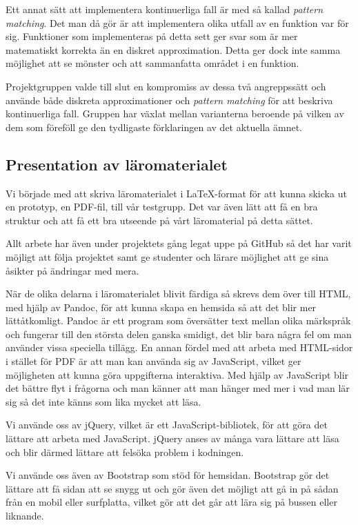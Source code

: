 \documentclass[12pt,a4paper,twoside,openright]{article}
\begin{document}
Ett annat sätt att implementera kontinuerliga fall är med så kallad
\textit{pattern matching}. Det man då gör är att implementera olika
utfall av en funktion var för sig. Funktioner som implementeras på
detta sett ger svar som är mer matematiskt korrekta än en diskret
approximation. Detta ger dock inte samma möjlighet att se mönster och
att sammanfatta området i en funktion.

Projektgruppen valde till slut en kompromiss av dessa två angreppssätt
och använde både diskreta approximationer och \textit{pattern
 matching} för att beskriva kontinuerliga fall. Gruppen har växlat
mellan varianterna beroende på vilken av dem som föreföll ge den
tydligaste förklaringen av det aktuella ämnet.

\subsection{Presentation av läromaterialet}
Vi började med att skriva läromaterialet i LaTeX-format för att kunna
skicka ut en prototyp, en PDF-fil, till vår testgrupp. Det var även
lätt att få en bra struktur och att få ett bra utseende på vårt
läromaterial på detta sättet.

Allt arbete har även under projektets gång legat uppe på GitHub så det
har varit möjligt att följa projektet samt ge studenter och lärare
möjlighet att ge sina åsikter på ändringar med mera.

När de olika delarna i läromaterialet blivit färdiga så skrevs dem
över till HTML, med hjälp av Pandoc, för att kunna skapa en hemsida så
att det blir mer lätt\-åtkomligt. Pandoc är ett program som översätter
text mellan olika märkspråk och fungerar till den största delen ganska
smidigt, det blir bara några fel om man använder vissa speciella
tillägg. En annan fördel med att arbeta med HTML-sidor i stället för
PDF är att man kan använda sig av JavaScript, vilket ger möjligheten
att kunna göra uppgifterna interaktiva. Med hjälp av JavaScript blir
det bättre flyt i frågorna och man känner att man hänger med mer i vad
man lär sig så det inte känns som lika mycket att läsa.


Vi använde oss av jQuery, vilket är ett JavaScript-bibliotek, för att
göra det lättare att arbeta med JavaScript. jQuery anses av många vara
lättare att läsa och blir därmed lättare att felsöka problem i
kodningen.

Vi använde oss även av Bootstrap som stöd för hemsidan. Bootstrap gör
det lättare att få sidan att se snygg ut och gör även det möjligt att
gå in på sådan från en mobil eller surfplatta, vilket gör att det går
att lära sig på bussen eller liknande.
\end{document}
